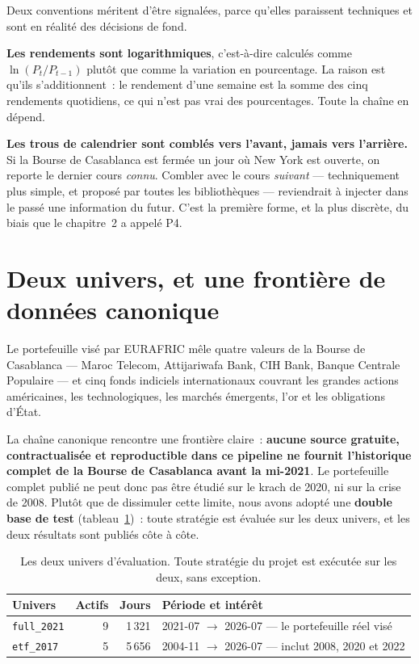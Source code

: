 Deux conventions méritent d'être signalées, parce qu'elles paraissent techniques
et sont en réalité des décisions de fond.

\textbf{Les rendements sont logarithmiques}, c'est-à-dire calculés comme
$\ln(P_t/P_{t-1})$ plutôt que comme la variation en pourcentage. La raison est
qu'ils s'additionnent~: le rendement d'une semaine est la somme des cinq
rendements quotidiens, ce qui n'est pas vrai des pourcentages. Toute la chaîne en
dépend.

\textbf{Les trous de calendrier sont comblés vers l'avant, jamais vers
l'arrière.} Si la Bourse de Casablanca est fermée un jour où New York est
ouverte, on reporte le dernier cours \emph{connu}. Combler avec le cours
\emph{suivant} — techniquement plus simple, et proposé par toutes les
bibliothèques — reviendrait à injecter dans le passé une information du futur.
C'est la première forme, et la plus discrète, du biais que le chapitre~2 a
appelé P4.

\section{Deux univers, et une frontière de données canonique}

Le portefeuille visé par EURAFRIC mêle quatre valeurs de la Bourse de Casablanca
— Maroc Telecom, Attijariwafa Bank, CIH Bank, Banque Centrale Populaire — et cinq
fonds indiciels internationaux couvrant les grandes actions américaines, les
technologiques, les marchés émergents, l'or et les obligations d'État.

La chaîne canonique rencontre une frontière claire~: \textbf{aucune source
gratuite, contractualisée et reproductible dans ce pipeline ne fournit l'historique
complet de la Bourse de Casablanca avant la mi-2021}. Le portefeuille complet
publié ne peut donc pas être étudié sur le krach de 2020, ni sur la crise de
2008. Plutôt que de dissimuler cette limite, nous avons adopté une \textbf{double
base de test} (tableau~\ref{tab:univers})~: toute stratégie est évaluée sur les
deux univers, et les deux résultats sont publiés côte à côte.

\begin{table}[htbp]
  \centering
  \small
  \caption[Les deux univers de test]{Les deux univers d'évaluation. Toute
  stratégie du projet est exécutée sur les deux, sans exception.}
  \label{tab:univers}
  \begin{tabular}{@{}lrrl@{}}
    \toprule
    \textbf{Univers} & \textbf{Actifs} & \textbf{Jours} & \textbf{Période et intérêt} \\
    \midrule
    \texttt{full\_2021} & 9 & 1\,321 &
    2021-07 $\rightarrow$ 2026-07 — le portefeuille réel visé \\
    \texttt{etf\_2017} & 5 & 5\,656 &
    2004-11 $\rightarrow$ 2026-07 — inclut 2008, 2020 et 2022 \\
    \bottomrule
  \end{tabular}
\end{table}


